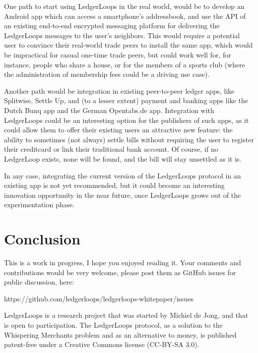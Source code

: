 \documentclass[11pt,twoside,a4paper]{article}
\begin{document}
One path to start using LedgerLoops in the real world, would be to develop an Android app which can access a smartphone's addressbook, and use the API of an existing end-to-end encrypted messaging platform for delivering the LedgerLoops messages to the user's neighbors. This would require a potential user to convince their real-world trade peers to install the same app, which would be impractical for casual one-time trade peers, but could work well for, for instance, people who share a house, or for the members of a sports club (where the administration of membership fees could be a driving use case).

Another path would be integration in existing peer-to-peer ledger apps, like Splitwise, Settle Up, and (to a lesser extent) payment and banking apps like the Dutch Bunq app and the German Opentabs.de app. Integration with LedgerLoops could be an interesting option for the publishers of such apps, as it could allow them to offer their existing users an attractive new feature: the ability to sometimes (not always) settle bills without requiring the user to register their creditcard or link their traditional bank account. Of course, if no LedgerLoop exists, none will be found, and the bill will stay unsettled as it is.

In any case, integrating the current version of the LedgerLoops protocol in an existing app is not yet recommended, but it could become an interesting innovation opportunity in the near future, once LedgerLoops grows out of the experimentation phase.

\section{Conclusion}
This is a work in progress, I hope you enjoyed reading it. Your comments and contributions would be very welcome, please post them as
GitHub issues for public discussion, here:

https://github.com/ledgerloops/ledgerloops-whitepaper/issues

LedgerLoops is a research project that was started by Michiel de Jong, and that is open to participation. The LedgerLoops protocol, as a solution to the Whispering Merchants problem and as an alternative to money, is published patent-free under a Creative Commons license (CC-BY-SA 3.0).


\end{document}
